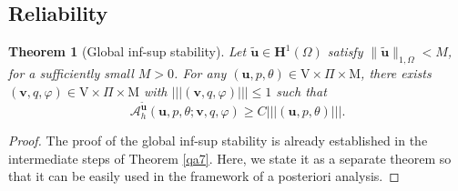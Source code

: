 \documentclass[10pt,a4paper]{article}
\newtheorem{theorem} {\bf Theorem}
\begin{document}
\subsection{Reliability}
\begin{theorem}[Global inf-sup stability]\label{inf_sup_global}
    Let $\boldsymbol{\tilde{u}} \in \boldsymbol{H}^1(\Omega)$ satisfy $\| \boldsymbol{\tilde{u}} \|_{1,\Omega} < M$, for
a sufficiently small $M > 0$. For any $(\boldsymbol{u}, p, \theta) \in \mathrm{V} \times \Pi  \times \mathrm{M}$, there exists $(\boldsymbol{v}, q, \varphi) \in \mathrm{V} \times \Pi  \times \mathrm{M}$ with $\left|\!\left|\!\left| (\boldsymbol{v}, q, \varphi) \right|\!\right|\!\right| \leq 1$ such
that
\[
\mathcal{A}_h^{\tilde{\boldsymbol{u}}}\left(\boldsymbol{u},p, \theta ; \boldsymbol{v},q , \varphi \right) \geq C \left|\!\left|\!\left| (\boldsymbol{u}, p, \theta )\right|\!\right|\!\right|.
\]
\end{theorem}
\begin{proof}
The proof of the global inf-sup stability is already established in the intermediate steps of Theorem \ref{qa7}. Here, we state it as a separate theorem so that it can be easily used in the framework of a posteriori  analysis. 
\end{proof}
\end{document}
